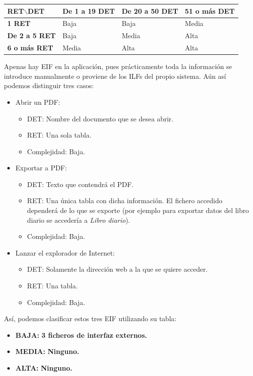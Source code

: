 \documentclass[spanish,a4paper,12pt]{report}	%
\begin{document}
			\begin{tabular}{|p{3cm}||p{3cm}|p{3.2cm}|p{3cm}|}
				\hline
				\textbf{RET$\backslash$DET} & \textbf{De 1 a 19 DET} & \textbf{De 20 a 50 DET} & \textbf{51  o más DET} \\ \hline \hline
				\textbf{1 RET} & Baja & Baja & Media \\ \hline 
				\textbf{De 2 a 5 RET} & Baja & Media & Alta \\ \hline 
				\textbf{6 o más RET} & Media & Alta & Alta \\ \hline 
			\end{tabular}

\vspace{0.35cm}

	Apenas hay EIF en la aplicación, pues prácticamente toda la información se introduce manualmente o proviene de los ILFs del propio sistema. Aún así podemos distinguir tres casos:
	\begin{itemize}
		\item{Abrir un PDF:} 
		\begin{itemize}
 			\item{DET:} Nombre del documento que se desea abrir.
			\item{RET:} Una sola tabla.
			\item{Complejidad:} Baja.
		\end{itemize}		
		\item{Exportar a PDF:} 
		\begin{itemize}
 			\item{DET:} Texto que contendrá el PDF.
			\item{RET:} Una única tabla con dicha información. El fichero accedido dependerá de lo que se exporte (por ejemplo para exportar datos del libro diario se accedería a \textit{Libro diario}).
			\item{Complejidad:} Baja.
		\end{itemize}
		\item{Lanzar el explorador de Internet:} 
		\begin{itemize}
 			\item{DET:} Solamente la dirección web a la que se quiere acceder.
			\item{RET:} Una tabla.
			\item{Complejidad:} Baja.
		\end{itemize}
	\end{itemize}

	Así, podemos clasificar estos tres EIF utilizando su tabla:
	\begin{itemize}
	\item{\textbf{BAJA:}} \textbf{3 ficheros de interfaz externos.}
	\item{\textbf{MEDIA:}} \textbf{Ninguno.}
	\item{\textbf{ALTA:}} \textbf{Ninguno.}
	\end{itemize}
\end{document}
